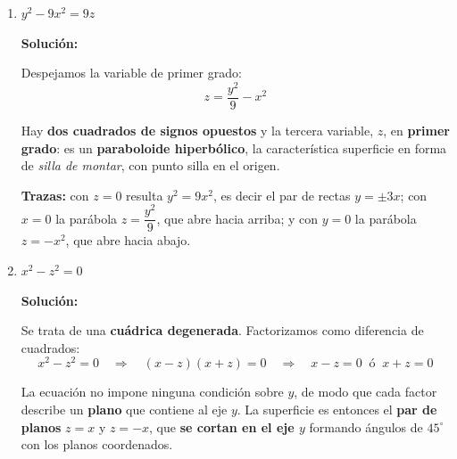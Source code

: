 \documentclass[12pt]{article}
\newcommand{\solucion}{%
    \vspace{0.8em}%
    \textbf{Solución:}%
    \vspace{0.8em}%
}
\begin{document}
\begin{enumerate}[label=\alph*.-]
    \item $y^{2}-9x^{2}=9z$

    \solucion

    Despejamos la variable de primer grado:
    \[
    \boxed{
    z=\frac{y^{2}}{9}-x^{2}
    }
    \]

    Hay \textbf{dos cuadrados de signos opuestos} y la tercera variable, $z$, en
    \textbf{primer grado}: es un \textbf{paraboloide hiperbólico}, la
    característica superficie en forma de \emph{silla de montar}, con punto
    silla en el origen.

    \textbf{Trazas:} con $z=0$ resulta $y^{2}=9x^{2}$, es decir el par de
    rectas $y=\pm 3x$; con $x=0$ la parábola $z=\dfrac{y^{2}}{9}$, que abre
    hacia arriba; y con $y=0$ la parábola $z=-x^{2}$, que abre hacia abajo.

    \begin{center}
    \end{center}

    \item $x^{2}-z^{2}=0$

    \solucion

    Se trata de una \textbf{cuádrica degenerada}. Factorizamos como diferencia
    de cuadrados:
    \[
    x^{2}-z^{2}=0
    \quad\Longrightarrow\quad
    (x-z)(x+z)=0
    \quad\Longrightarrow\quad
    \boxed{
    x-z=0
    \;\;\text{ó}\;\;
    x+z=0
    }
    \]

    La ecuación no impone ninguna condición sobre $y$, de modo que cada factor
    describe un \textbf{plano} que contiene al eje $y$. La superficie es
    entonces el \textbf{par de planos} $z=x$ y $z=-x$, que
    \textbf{se cortan en el eje $y$} formando ángulos de $45^{\circ}$ con los
    planos coordenados.

    \begin{center}
    \end{center}


\end{enumerate}
\end{document}
